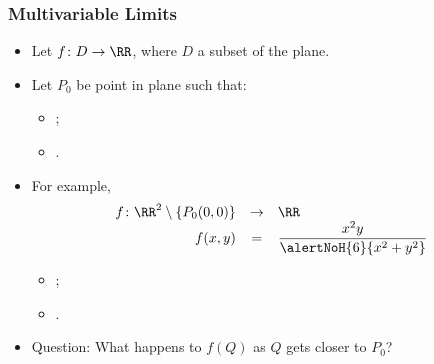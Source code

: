 \begin{frame}
\frametitle{Multivariable Limits}
\begin{itemize}
\item Let $f\colon D \to \RR$, where $D$ a subset of the plane.
\item<2-> Let $P_0$ be point in plane such that:
\begin{itemize}
\item<2-> ;
\item<3-> .
\end{itemize}
\item<4-> For example,
\[
\begin{array}{rcl}
\displaystyle f \colon  \RR^2\setminus \{ P_0(0,0)\} &\to&\displaystyle  \RR \\
\displaystyle f(x,y)& =& \displaystyle \frac{x^2y}{\alertNoH{6} {x^2+y^2}}
\end{array}
\]
\begin{itemize}
\item<4-> ;
\item<4-> .
\end{itemize}
\item<7-> Question: What happens to $f(Q)$ as $Q$ gets closer to $P_0$?
\end{itemize}
\end{frame}
